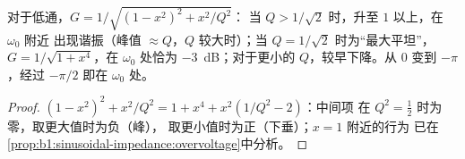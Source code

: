 \begin{proposition}\label{prop:b1:filters-transfer-functions:lowpass2}
对于低通，$G = 1/\sqrt{(1 - x^2)^2 + x^2/Q^2}$：
当 $Q > 1/\sqrt2$ 时，升至 $1$ 以上，在 $\omega_0$ 附近
出现谐振（峰值 $\approx Q$，$Q$ 较大时）；当 $Q = 1/\sqrt2$ 时为“最大平坦”，
$G = 1/\sqrt{1 + x^4}$，在 $\omega_0$ 处恰为 \qty{-3}{dB}；对于更小的
$Q$，较早下降。从 $0$ 变到 $-\pi$，经过 $-\pi/2$
即在 $\omega_0$ 处。
\end{proposition}

\begin{proof}
$(1 - x^2)^2 + x^2/Q^2 = 1 + x^4 + x^2(1/Q^2 - 2)$：中间项
在 $Q^2 = \tfrac12$ 时为零，取更大值时为负（峰），
取更小值时为正（下垂）；$x = 1$ 附近的行为
已在\cref{prop:b1:sinusoidal-impedance:overvoltage}中分析。
\end{proof}

